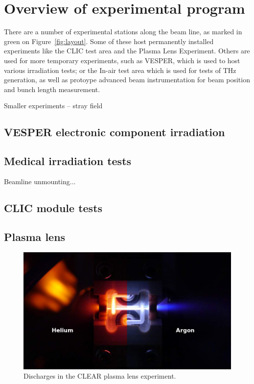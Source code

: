 \documentclass[a4paper,
               keeplastbox,   %
               ]{jacow}
\begin{document}
\section{Overview of experimental program}

There are a number of experimental stations along the beam line, as marked in green on Figure~\ref{fig:layout}.
Some of these host permanently installed experiments like the CLIC test area and the Plasma Lens Experiment.
Others are used for more temporary experiments, such as VESPER, which is used to host various irradiation tests; or the In-air test area which is used for tests of THz generation, as well as protoype advanced beam instrumentation for beam position and bunch length measurement.

Smaller experiments -- stray field

\subsection{VESPER electronic component irradiation}

\subsection{Medical irradiation tests}
Beamline unmounting...

\subsection{CLIC module tests}

\subsection{Plasma lens}
\begin{figure}
    \includegraphics[width=\columnwidth]{fig/HeAr.png}
    \caption{Discharges in the CLEAR plasma lens experiment.}
\end{figure}
\end{document}
